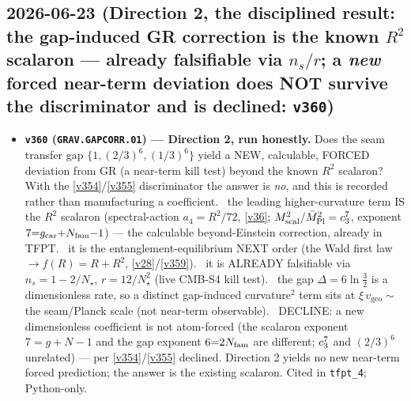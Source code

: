 \subsection*{2026-06-23 (Direction 2, the disciplined result: the gap-induced GR correction is the known $R^2$ scalaron --- already falsifiable via $n_s/r$; a \emph{new} forced near-term deviation does NOT survive the discriminator and is declined: \texttt{v360})}
\begin{itemize}
\item \textbf{\texttt{v360} (\texttt{GRAV.GAPCORR.01}) --- Direction 2, run honestly.} Does the seam transfer gap
$\{1,(2/3)^6,(1/3)^6\}$ yield a NEW, calculable, FORCED deviation from GR (a near-term kill test) beyond the known
$R^2$ scalaron? With the \vref{v354}/\vref{v355} discriminator the answer is \emph{no}, and this is recorded rather
than manufacturing a coefficient. \mE\ the leading higher-curvature term IS the $R^2$ scalaron (spectral-action
$a_4{=}R^2/72$, \vref{v36}; $M_{\mathrm{scal}}^2/\bar M_{\mathrm{Pl}}^2=c_3^7$, exponent $7{=}g_{\mathrm{car}}{+}N_{\mathrm{fam}}{-}1$) --- the
calculable beyond-Einstein correction, already in TFPT. \mC\ it is the entanglement-equilibrium NEXT order (the Wald
first law $\to f(R){=}R{+}R^2$, \vref{v28}/\vref{v359}). \mE\ it is ALREADY falsifiable via $n_s{=}1{-}2/N_\star$,
$r{=}12/N_\star^2$ (live CMB-S4 kill test). \mE\ the gap $\Delta{=}6\ln\tfrac32$ is a dimensionless rate, so a
distinct gap-induced curvature$^2$ term sits at $\xi\,v_{\mathrm{geo}}\sim$ the seam/Planck scale (not near-term
observable). \mO\ DECLINE: a new dimensionless coefficient is not atom-forced (the scalaron exponent $7{=}g{+}N{-}1$
and the gap exponent $6{=}2N_{\mathrm{fam}}$ are different; $c_3^7$ and $(2/3)^6$ unrelated) --- per \vref{v354}/\vref{v355}
declined. Direction 2 yields no new near-term forced prediction; the answer is the existing scalaron. Cited in
\texttt{tfpt\_4}; Python-only.
\end{itemize}

